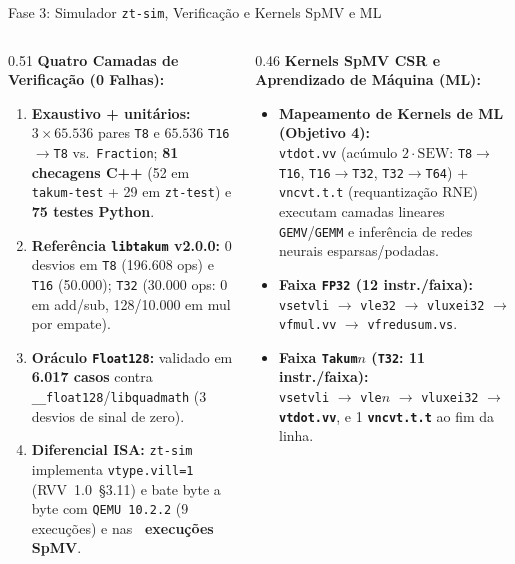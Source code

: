 \documentclass[aspectratio=169,10pt]{beamer}
\begin{document}
\begin{frame}{Fase 3: Simulador \texttt{zt-sim}, Verificação e Kernels SpMV e ML}
	\footnotesize
	\begin{columns}[T,onlytextwidth]
		\begin{column}{0.51\textwidth}
			\textbf{Quatro Camadas de Verificação (0 Falhas):}
			\begin{enumerate}
				\item \textbf{Exaustivo + unitários:} $3\times 65.536$ pares \texttt{T8} e $65.536$ \texttt{T16$\to$T8} vs.\ \texttt{Fraction}; \textbf{81 checagens C++} (52 em \texttt{takum-test} + 29 em \texttt{zt-test}) e \textbf{75 testes Python}.
				\item \textbf{Referência \texttt{libtakum} v2.0.0:} 0 desvios em \texttt{T8} (196.608 ops) e \texttt{T16} (50.000); \texttt{T32} (30.000 ops: 0 em add/sub, 128/10.000 em mul por empate).
				\item \textbf{Oráculo \texttt{Float128}:} validado em \textbf{6.017 casos} contra \texttt{\_\_float128}/\texttt{libquadmath} (3 desvios de sinal de zero).
				\item \textbf{Diferencial ISA:} \texttt{zt-sim} implementa \texttt{vtype.vill=1} (RVV~1.0~\S3.11) e bate byte a byte com \texttt{QEMU 10.2.2} (9 execuções) e nas \textbf{\NumExecSpmv\ execuções SpMV}.
			\end{enumerate}
		\end{column}
		\begin{column}{0.46\textwidth}
			\textbf{Kernels SpMV CSR e Aprendizado de Máquina (ML):}
			\begin{itemize}
				\item \textbf{Mapeamento de Kernels de ML (Objetivo 4):}\\
				      \texttt{vtdot.vv} (acúmulo $2\cdot\mathrm{SEW}$: \texttt{T8$\to$T16}, \texttt{T16$\to$T32}, \texttt{T32$\to$T64}) + \texttt{vncvt.t.t} (requantização RNE) executam camadas lineares \texttt{GEMV}/\texttt{GEMM} e inferência de redes neurais esparsas/podadas.
				\item \textbf{Faixa \texttt{FP32} (12 instr./faixa):}\\
				      \texttt{vsetvli} $\to$ \texttt{vle32} $\to$ \texttt{vluxei32} $\to$ \texttt{vfmul.vv} $\to$ \texttt{vfredusum.vs}.
				\item \textbf{Faixa \texttt{Takum$n$} (\texttt{T32}: 11 instr./faixa):}\\
				      \texttt{vsetvli} $\to$ \texttt{vle$n$} $\to$ \texttt{vluxei32} $\to$ \textbf{\texttt{vtdot.vv}}, e 1 \textbf{\texttt{vncvt.t.t}} ao fim da linha.
			\end{itemize}
		\end{column}
	\end{columns}
\end{frame}
\end{document}
